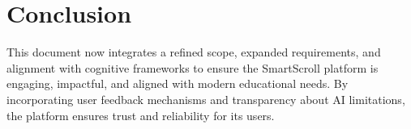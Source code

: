 \documentclass[12pt]{article}
\begin{document}
\section{Conclusion}
This document now integrates a refined scope, expanded requirements, and alignment with cognitive frameworks to ensure the SmartScroll platform is engaging, impactful, and aligned with modern educational needs. By incorporating user feedback mechanisms and transparency about AI limitations, the platform ensures trust and reliability for its users.
\end{document}
